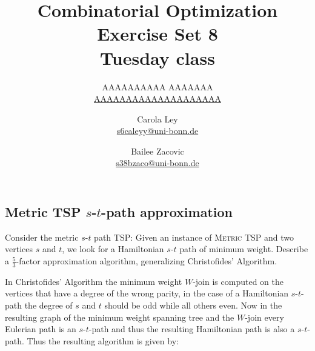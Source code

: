 \documentclass{article}
\title{Combinatorial Optimization \\ Exercise Set 8 \\ Tuesday class}
\author{
  AAAAAAAAAA AAAAAAA \\
  \href{mailto:AAAAAAAAAAAAAAAAAAAA}{AAAAAAAAAAAAAAAAAAAA}
  \and
  Carola Ley \\
  \href{mailto:s6caleyy@uni-bonn.de}{s6caleyy@uni-bonn.de}
  \and
  Bailee Zacovic \\
  \href{mailto:s38bzaco@uni-bonn.de}{s38bzaco@uni-bonn.de}
}
\begin{document}
  \maketitle

  \setcounter{section}{8}
  \subsection{Metric TSP $s$-$t$-path approximation}
  \begin{centerframebox}
    Consider the metric $s$-$t$ path TSP: Given an instance of \textsc{Metric TSP}
    and two vertices $s$ and $t$, we look for a Hamiltonian $s$-$t$ path of minimum
    weight. Describe a $\frac{5}{3}$-factor approximation algorithm, generalizing Christofides'
    Algorithm.
  \end{centerframebox}
  In Christofides' Algorithm  the minimum weight $W$-join is computed on the vertices that have a degree of the wrong parity, in the case of a Hamiltonian $s$-$t$-path the degree of $s$ and $t$ should be odd while all others even. Now in the resulting graph of the minimum weight spanning tree and the $W$-join every Eulerian path is an $s$-$t$-path and thus the resulting Hamiltonian path is also a $s$-$t$-path. Thus the resulting algorithm is given by:
\end{document}

